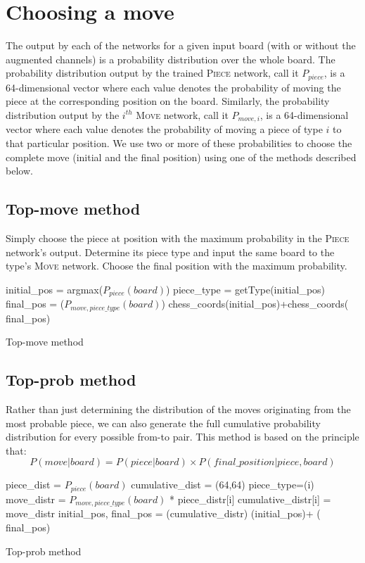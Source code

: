 \section{Choosing a move}
The output by each of the networks for a given input board (with or without the 
augmented channels) is a probability distribution over the whole board. The 
probability distribution output by the trained \textsc{Piece} network, call it 
$P_{piece}$, is a 64-dimensional vector where each value denotes the probability 
of moving the piece at the corresponding position on the board. Similarly, the 
probability distribution output by the $i^{th}$ \textsc{Move} network, call it 
$P_{move,i}$, is a 64-dimensional vector where each value denotes the 
probability of moving a piece of type $i$ to that particular position. We use 
two or more of these probabilities to choose the complete move (initial and the 
final position) using one of the methods described below.
\subsection{Top-move method}
Simply choose the piece at position with the maximum probability in the 
\textsc{Piece} network's output. Determine its piece type and input the same 
board to the type's \textsc{Move} network. Choose the final position with the 
maximum probability.
\begin{algorithm}[H]
\begin{algorithmic}[1]
 	\State initial\_pos = argmax($P_{piece}(board)$)\;
   	\State piece\_type = getType(initial\_pos)\;
   	\State final\_pos = ($P_{move,piece\_type}(board)$)\;
   	\Return chess\_coords(initial\_pos)+chess\_coords(	final\_pos)\;
\end{algorithmic}
\caption{Top-move method}
\label{alg:topmove}
\end{algorithm}

\subsection{Top-prob method}
\label{subsection:topprob}
Rather than just determining the distribution of the moves originating from the 
most probable piece, we can also generate the full cumulative probability 
distribution for every possible from-to pair. This method is based on the 
principle that: 
\[P(move | board ) = P(piece | board )\times 
P(final\_position|piece, board)\]

\begin{algorithm}[H]
 \begin{algorithmic}[1]
 	\State piece\_dist = $P_{piece}(board)$
   	\State cumulative\_dist = (64,64)
   			\State piece\_type=(i)
   			\State move\_distr = $P_{move,piece\_type}(board)$ * 
piece\_distr[i]
   			\State cumulative\_distr[i] = move\_distr
   		\EndIf
   	\EndFor
   	\State initial\_pos, final\_pos = (cumulative\_distr)
   	\Return {}(initial\_pos)+	
(	final\_pos)
 \end{algorithmic}
 \caption{Top-prob method}
 \label{alg:topprob}
\end{algorithm}

